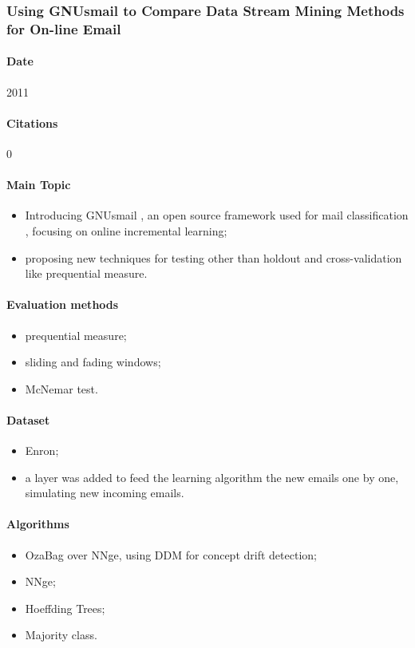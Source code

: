 \documentclass[12pt]{article}
\begin{document}
\subsubsection{Using GNUsmail to Compare Data Stream Mining Methods for On-line Email}
\paragraph{Date} 2011

\paragraph{Citations} 0

\paragraph{Main Topic}
\begin{itemize}
    \item Introducing GNUsmail , an open source framework used for mail classification , focusing on online incremental learning;
    \item proposing new techniques for testing other than holdout and cross-validation like prequential measure.
\end{itemize}

\paragraph{Evaluation methods}
\begin{itemize}
    \item prequential measure;
    \item sliding and fading windows;
    \item McNemar test.
\end{itemize}

\paragraph{Dataset}
\begin{itemize}
    \item Enron;
    \item a layer was added to feed the learning algorithm the new emails one by one, simulating new incoming emails.
\end{itemize}

\paragraph{Algorithms}
\begin{itemize}
    \item OzaBag over NNge, using DDM for concept drift detection;
    \item NNge;
    \item Hoeffding Trees;
    \item Majority class.
\end{itemize}
\end{document}
